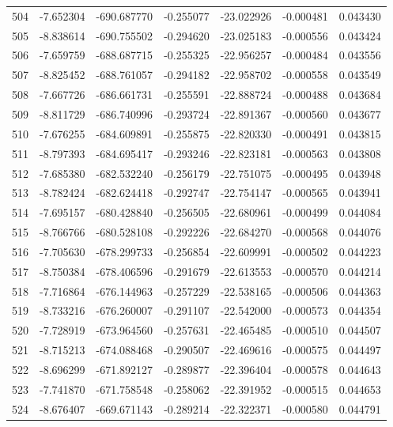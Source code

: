 \begin{tabular}{rrrrrrr}
 504 &  -7.652304 & -690.687770 & -0.255077 & -23.022926 &  -0.000481 &  0.043430 \\
 505 &  -8.838614 & -690.755502 & -0.294620 & -23.025183 &  -0.000556 &  0.043424 \\
 506 &  -7.659759 & -688.687715 & -0.255325 & -22.956257 &  -0.000484 &  0.043556 \\
 507 &  -8.825452 & -688.761057 & -0.294182 & -22.958702 &  -0.000558 &  0.043549 \\
 508 &  -7.667726 & -686.661731 & -0.255591 & -22.888724 &  -0.000488 &  0.043684 \\
 509 &  -8.811729 & -686.740996 & -0.293724 & -22.891367 &  -0.000560 &  0.043677 \\
 510 &  -7.676255 & -684.609891 & -0.255875 & -22.820330 &  -0.000491 &  0.043815 \\
 511 &  -8.797393 & -684.695417 & -0.293246 & -22.823181 &  -0.000563 &  0.043808 \\
 512 &  -7.685380 & -682.532240 & -0.256179 & -22.751075 &  -0.000495 &  0.043948 \\
 513 &  -8.782424 & -682.624418 & -0.292747 & -22.754147 &  -0.000565 &  0.043941 \\
 514 &  -7.695157 & -680.428840 & -0.256505 & -22.680961 &  -0.000499 &  0.044084 \\
 515 &  -8.766766 & -680.528108 & -0.292226 & -22.684270 &  -0.000568 &  0.044076 \\
 516 &  -7.705630 & -678.299733 & -0.256854 & -22.609991 &  -0.000502 &  0.044223 \\
 517 &  -8.750384 & -678.406596 & -0.291679 & -22.613553 &  -0.000570 &  0.044214 \\
 518 &  -7.716864 & -676.144963 & -0.257229 & -22.538165 &  -0.000506 &  0.044363 \\
 519 &  -8.733216 & -676.260007 & -0.291107 & -22.542000 &  -0.000573 &  0.044354 \\
 520 &  -7.728919 & -673.964560 & -0.257631 & -22.465485 &  -0.000510 &  0.044507 \\
 521 &  -8.715213 & -674.088468 & -0.290507 & -22.469616 &  -0.000575 &  0.044497 \\
 522 &  -8.696299 & -671.892127 & -0.289877 & -22.396404 &  -0.000578 &  0.044643 \\
 523 &  -7.741870 & -671.758548 & -0.258062 & -22.391952 &  -0.000515 &  0.044653 \\
 524 &  -8.676407 & -669.671143 & -0.289214 & -22.322371 &  -0.000580 &  0.044791 \\

\end{tabular}
